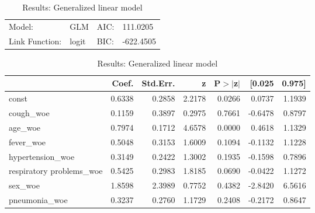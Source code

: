 \begin{table}[H]
	\renewcommand{\arraystretch}{1.25}
	\begin{center}
	\begin{tabular}{llll}
	\hline
	Model:              & GLM              & AIC:            & 111.0205   \\
	Link Function:      & logit            & BIC:            & -622.4505  \\
	\hline
	\end{tabular}
	\end{center}
	\begin{center}
	\begin{tabular}{lrrrrrr}
	\hline
	                          & Coef.  & Std.Err. &   z    & P$> |$z$|$ &  [0.025 & 0.975]  \\
	\hline
	\hline
	const                     & 0.6338 &   0.2858 & 2.2178 &      0.0266 &  0.0737 & 1.1939  \\
	cough\_woe                & 0.1159 &   0.3897 & 0.2975 &      0.7661 & -0.6478 & 0.8797  \\
	age\_woe                  & 0.7974 &   0.1712 & 4.6578 &      0.0000 &  0.4618 & 1.1329  \\
	fever\_woe                & 0.5048 &   0.3153 & 1.6009 &      0.1094 & -0.1132 & 1.1228  \\
	hypertension\_woe         & 0.3149 &   0.2422 & 1.3002 &      0.1935 & -0.1598 & 0.7896  \\
	respiratory problems\_woe & 0.5425 &   0.2983 & 1.8185 &      0.0690 & -0.0422 & 1.1272  \\
	sex\_woe                  & 1.8598 &   2.3989 & 0.7752 &      0.4382 & -2.8420 & 6.5616  \\
	pneumonia\_woe            & 0.3237 &   0.2760 & 1.1729 &      0.2408 & -0.2172 & 0.8647  \\
	\hline
	\end{tabular}	
	\end{center}
	\caption{Results: Generalized linear model \label{table:covid_results}}
\end{table}

